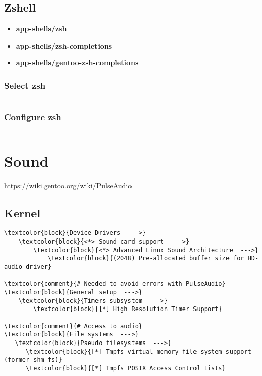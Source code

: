 \documentclass[10pt, a4paper, onecolumn, openany]{book}         %
\begin{document}
\section{Zshell}
\begin{itemize}
    \item \textbf{app-shells/zsh}
    \item \textbf{app-shells/zsh-completions}
    \item \textbf{app-shells/gentoo-zsh-completions}
\end{itemize}
\subsection{Select zsh}
\begin{Verbatim}[commandchars=\\\{\}]

\end{Verbatim}


\subsection{Configure zsh}
\begin{Verbatim}[commandchars=\\\{\}]

\end{Verbatim}



\chapter{Sound}
\underline{\url{https://wiki.gentoo.org/wiki/PulseAudio}}\newline
\section{Kernel}
\begin{Verbatim}[commandchars=\\\{\}]
\textcolor{block}{Device Drivers  --->}
    \textcolor{block}{<*> Sound card support  --->}
        \textcolor{block}{<*> Advanced Linux Sound Architecture  --->}
            \textcolor{block}{(2048) Pre-allocated buffer size for HD-audio driver}

\textcolor{comment}{# Needed to avoid errors with PulseAudio}
\textcolor{block}{General setup  --->}
    \textcolor{block}{Timers subsystem  --->}
        \textcolor{block}{[*] High Resolution Timer Support}

\textcolor{comment}{# Access to audio}        
\textcolor{block}{File systems  --->}
   \textcolor{block}{Pseudo filesystems  --->}
      \textcolor{block}{[*] Tmpfs virtual memory file system support (former shm fs)}
      \textcolor{block}{[*] Tmpfs POSIX Access Control Lists}
\end{Verbatim}
\end{document}
